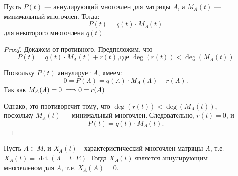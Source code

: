 \vspace{0.1cm}
\begin{shth}
\begin{theorem}
\leavevmode \nl

    Пусть \(P(t)\) — аннулирующий многочлен для матрицы \(A\), а \(M_{A}(t)\) — минимальный многочлен. Тогда:
    \[
    P(t) = q(t) \cdot M_{A}(t)
    \]
    для некоторого многочлена \(q(t)\).
\end{theorem}
\end{shth}

\begin{proof}

    Докажем от противного. Предположим, что
    \[
    P(t) = q(t) \cdot M_{A}(t) + r(t), \text{где }\deg(r(t)) < \deg(M_{A}(t))
    \]
    

    Поскольку \(P(t)\) аннулирует \(A\), имеем:
    \[
    0 = P(A) = q(A) \cdot M_{A}(A) + r(A).
    \]
    Так как \(M_{A}(A) = 0 \; \Longrightarrow 0 = r(A) \)
    
    Однако, это противоречит тому, что \(\deg(r(t)) < \deg(M_{A}(t))\), поскольку \(M_{A}(t)\) — минимальный многочлен. Следовательно, \(r(t) = 0\), и
    \[
    P(t) = q(t) \cdot M_{A}(t).
    \]
\end{proof}


\begin{shth}
\begin{theorem}
\leavevmode \nl 

    Пусть \( A \in M \), и \( X_{A}(t) \) - характеристический многочлен матрицы \( A \), т.е. \\ \( X_{A}(t) = \det(A - t \cdot E) \). Тогда \( X_{A}(t) \) является аннулирующим многочленом для \( A \), т.е. \( X_{A}(A) = 0 \).
\end{theorem}
\end{shth}

